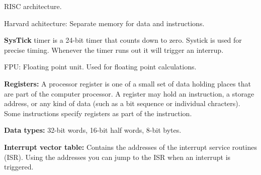 RISC architecture.

Harvard achitecture: Separate memory for data and instructions.


\textbf{SysTick} timer is a 24-bit timer that counts down to zero.
Systick is used for precise timing. Whenever the timer runs out
it will trigger an interrup.

FPU: Floating point unit. Used for floating point calculations.

\textbf{Registers:} A processor register is one of a small set of data holding places
that are part of the computer processor. A register may hold an instruction,
a storage address, or any kind of data (such as a bit sequence or individual chracters).
Some  instructions specify registers as part of the instruction.

\textbf{Data types:} 32-bit words, 16-bit half words, 8-bit bytes.

\textbf{Interrupt vector table:} Contains the addresses of the interrupt service routines (ISR).
Using the addresses you can jump to the ISR when an interrupt is triggered.
